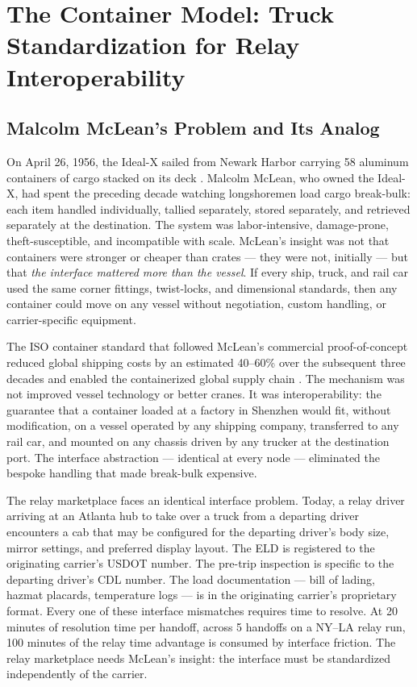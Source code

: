\section{The Container Model: Truck Standardization for Relay Interoperability}
\label{sec:container-model}

\subsection{Malcolm McLean's Problem and Its Analog}

On April 26, 1956, the Ideal-X sailed from Newark Harbor carrying 58 aluminum containers of cargo stacked on its deck \citep{Levinson2006}. Malcolm McLean, who owned the Ideal-X, had spent the preceding decade watching longshoremen load cargo break-bulk: each item handled individually, tallied separately, stored separately, and retrieved separately at the destination. The system was labor-intensive, damage-prone, theft-susceptible, and incompatible with scale. McLean's insight was not that containers were stronger or cheaper than crates --- they were not, initially --- but that \textit{the interface mattered more than the vessel}. If every ship, truck, and rail car used the same corner fittings, twist-locks, and dimensional standards, then any container could move on any vessel without negotiation, custom handling, or carrier-specific equipment.

The ISO container standard that followed McLean's commercial proof-of-concept reduced global shipping costs by an estimated 40--60\% over the subsequent three decades and enabled the containerized global supply chain \citep{Levinson2006}. The mechanism was not improved vessel technology or better cranes. It was interoperability: the guarantee that a container loaded at a factory in Shenzhen would fit, without modification, on a vessel operated by any shipping company, transferred to any rail car, and mounted on any chassis driven by any trucker at the destination port. The interface abstraction --- identical at every node --- eliminated the bespoke handling that made break-bulk expensive.

The relay marketplace faces an identical interface problem. Today, a relay driver arriving at an Atlanta hub to take over a truck from a departing driver encounters a cab that may be configured for the departing driver's body size, mirror settings, and preferred display layout. The ELD is registered to the originating carrier's USDOT number. The pre-trip inspection is specific to the departing driver's CDL number. The load documentation --- bill of lading, hazmat placards, temperature logs --- is in the originating carrier's proprietary format. Every one of these interface mismatches requires time to resolve. At 20 minutes of resolution time per handoff, across 5 handoffs on a NY--LA relay run, 100 minutes of the relay time advantage is consumed by interface friction. The relay marketplace needs McLean's insight: the interface must be standardized independently of the carrier.

